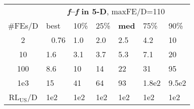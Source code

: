 \begin{tabular}{c|llllll}
 & \multicolumn{6}{|c}{\textbf{\textit{f}\raisebox{-0.35ex}{1}--\textit{f}\raisebox{-0.35ex}{24} in 5-D}, maxFE/D=110}\\
\#FEs/D & best & 10\% & 25\% & \textbf{med} & 75\% & 90\%\\
2 & ~\,0.76 & \hspace*{1ex}1.0 & \hspace*{1ex}2.0 & \hspace*{1ex}2.5 & \hspace*{1ex}4.2 & 10\\
10 & \hspace*{1ex}1.6 & \hspace*{1ex}3.1 & \hspace*{1ex}3.7 & \hspace*{1ex}5.3 & \hspace*{1ex}7.1 & 20\\
100 & \hspace*{1ex}8.6 & 10 & 14 & 22 & 31 & 95\\
1e3 & 15 & 41 & 64 & 93 & 1.8e2 & 9.5e2\\
$\text{RL}_{\text{US}}$/D & 1e2 & 1e2 & 1e2 & 1e2 & 1e2 & 1e2
\end{tabular}
